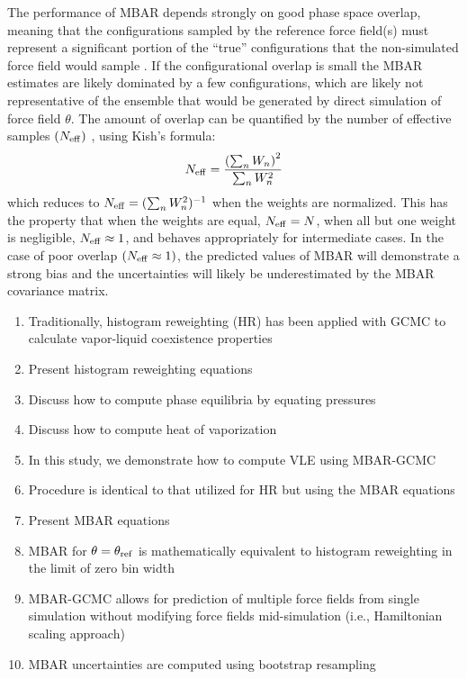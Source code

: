 \documentclass[journal=jced,manuscript=article]{achemso}
\begin{document}
The performance of MBAR depends strongly on good phase space overlap, meaning that the configurations sampled by the reference force field(s) must represent a significant portion of the ``true'' configurations that the non-simulated force field would sample \cite{naden:jctc:2016}. If the configurational overlap is small the MBAR estimates are likely dominated by a few configurations, which are likely not representative of the ensemble that would be generated by direct simulation of force field $\theta$. The amount of overlap can be quantified by the number of effective samples $(N_{\rm eff})$ \cite{Dybeck2016}, using Kish's formula:
\begin{eqnarray} \label{Neff}
N_{\rm eff} = \frac{\left(\sum_n W_n\right)^2}{\sum_n W_n^2}
\end{eqnarray}
which reduces to $N_{\rm eff} = (\sum_n W_n^2)^{-1}$ when the weights are
normalized. This has the property that when the weights are equal,
$N_{\rm eff} = N$, when all but one weight is negligible, $N_{\rm eff} \approx
1$, and behaves appropriately for intermediate cases. 
In the case of poor overlap $(N_{\rm eff} \approx 1)$, the predicted values of MBAR will demonstrate a strong bias and the uncertainties will likely be underestimated by the MBAR covariance matrix. 



\begin{enumerate}
	\item Traditionally, histogram reweighting (HR) has been applied with GCMC to calculate vapor-liquid coexistence properties
	\item Present histogram reweighting equations
	\item Discuss how to compute phase equilibria by equating pressures
	\item Discuss how to compute heat of vaporization
	\item In this study, we demonstrate how to compute VLE using MBAR-GCMC
	\item Procedure is identical to that utilized for HR but using the MBAR equations
	\item Present MBAR equations
	\item MBAR for $\theta = \theta_{\rm ref}$ is mathematically equivalent to histogram reweighting in the limit of zero bin width
	\item MBAR-GCMC allows for prediction of multiple force fields from single simulation without modifying force fields mid-simulation (i.e., Hamiltonian scaling approach)
	\item MBAR uncertainties are computed using bootstrap resampling
\end{enumerate}
\end{document}
